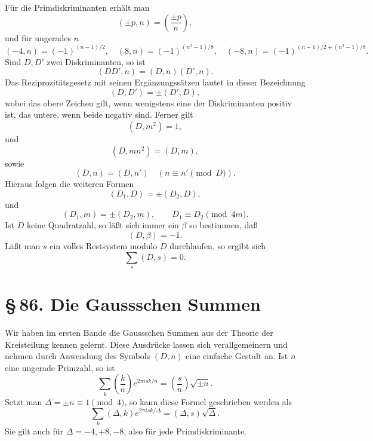 \documentclass[11pt]{article}
\newcommand{\Jac}[2]{\left(\frac{#1}{#2}\right)}
\begin{document}
Für die Primdiskriminanten erhält man
\begin{equation}
        (\pm p,n)=\Jac{\pm p}{n},
\tag{10}
\end{equation}
und für ungerades \(n\)
\begin{equation}
        (-4,n)=(-1)^{(n-1)/2},\quad
        (8,n)=(-1)^{(n^2-1)/8},\quad
        (-8,n)=(-1)^{(n-1)/2+(n^2-1)/8}.
\tag{11}
\end{equation}
Sind \(D,D'\) zwei Diskriminanten, so ist
\begin{equation}
        (DD',n)=(D,n)(D',n).
\tag{12}
\end{equation}
Das Reziprozitätsgesetz mit seinen Ergänzungssätzen lautet in dieser Bezeichnung
\begin{equation}
        (D,D')=\pm(D',D),
\tag{13}
\end{equation}
wobei das obere Zeichen gilt, wenn wenigstens eine der Diskriminanten positiv ist, das untere, wenn beide negativ sind.  Ferner gilt
\begin{equation}
        (D,m^2)=1,
\tag{14}
\end{equation}
und
\begin{equation}
        (D,mn^2)=(D,m),
\tag{15}
\end{equation}
sowie
\begin{equation}
        (D,n)=(D,n')\quad(n\equiv n'\pmod D).
\tag{16}
\end{equation}
Hieraus folgen die weiteren Formen
\begin{equation}
        (D_1,D)=\pm(D_2,D),
\tag{17}
\end{equation}
und
\begin{equation}
        (D_1,m)=\pm(D_2,m),\qquad D_1\equiv D_2\pmod {4m}.
\tag{18--19}
\end{equation}
Ist \(D\) keine Quadratzahl, so läßt sich immer ein \(\beta\) so bestimmen, daß
\begin{equation}
        (D,\beta)=-1.
\tag{21}
\end{equation}
Läßt man \(s\) ein volles Restsystem modulo \(D\) durchlaufen, so ergibt sich
\begin{equation}
        \sum_s(D,s)=0.
\tag{22}
\end{equation}

\section*{\S\,86. Die Gaussschen Summen}

Wir haben im ersten Bande die Gaussschen Summen aus der Theorie der Kreisteilung kennen gelernt.  Diese Ausdrücke lassen sich verallgemeinern und nehmen durch Anwendung des Symbols \((D,n)\) eine einfache Gestalt an.  Ist \(n\) eine ungerade Primzahl, so ist
\begin{equation}
        \sum_k \Jac{k}{n}e^{2\pi isk/n}=\Jac{s}{n}\sqrt{\pm n}.
\tag{1}
\end{equation}
Setzt man \(\Delta=\pm n\equiv1\pmod4\), so kann diese Formel geschrieben werden als
\begin{equation}
        \sum_k(\Delta,k)e^{2\pi isk/\Delta}=(\Delta,s)\sqrt{\Delta}.
\tag{2}
\end{equation}
Sie gilt auch für \(\Delta=-4,+8,-8\), also für jede Primdiskriminante.
\end{document}
